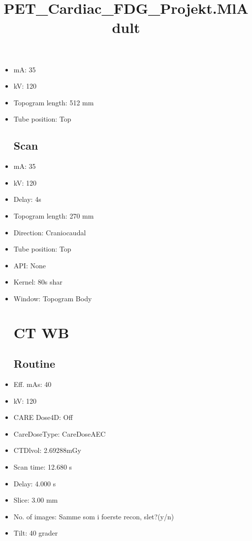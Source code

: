 \documentclass[12pt]{article}
\title{PET\_Cardiac\_FDG\_Projekt.MlAdult}
\begin{document}
\maketitle
\newpage
\tableofcontents
\newpage
{}


\begin{itemize}\section{Topogram}
\subsection{Routine}
\item mA: 35\item kV: 120\item Topogram length: 512 mm\item Tube position: Top
\subsection{Scan}\item mA: 35\item kV: 120\item Delay: 4s\item Topogram length: 270 mm\item Direction: Craniocaudal\item Tube position: Top\item API: None\item Kernel: 80s shar\item Window: Topogram Body
\section{CT WB}
\subsection{Routine}
\item Eff. mAs: 40\item kV: 120\item CARE Dose4D: Off\item CareDoseType: CareDoseAEC\item CTDlvol: 2.69288mGy\item Scan time: 12.680 s\item Delay: 4.000 s\item Slice: 3.00 mm\item No. of images: Samme som i foerste recon, slet?(y/n)\item Tilt: 40 grader

\end{itemize}
\end{document}
